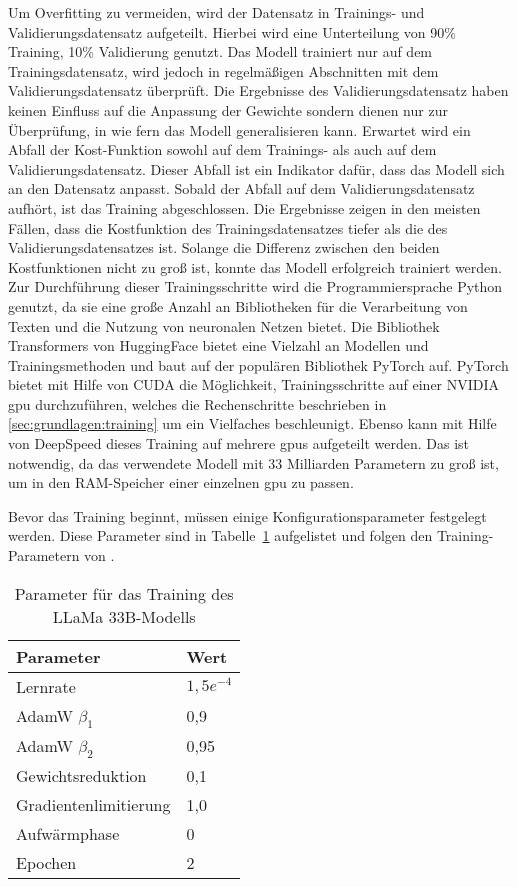 Um Overfitting zu vermeiden, wird der Datensatz in Trainings- und Validierungsdatensatz aufgeteilt.
Hierbei wird eine Unterteilung von 90\% Training, 10\% Validierung genutzt.
Das Modell trainiert nur auf dem Trainingsdatensatz, wird jedoch in regelmäßigen Abschnitten mit dem Validierungsdatensatz überprüft.
Die Ergebnisse des Validierungsdatensatz haben keinen Einfluss auf die Anpassung der Gewichte sondern dienen nur zur Überprüfung, in wie fern das Modell generalisieren kann.
Erwartet wird ein Abfall der Kost-Funktion sowohl auf dem Trainings- als auch auf dem Validierungsdatensatz.
Dieser Abfall ist ein Indikator dafür, dass das Modell sich an den Datensatz anpasst.
Sobald der Abfall auf dem Validierungsdatensatz aufhört, ist das Training abgeschlossen.
Die Ergebnisse zeigen in den meisten Fällen, dass die Kostfunktion des Trainingsdatensatzes tiefer als die des Validierungsdatensatzes ist.
Solange die Differenz zwischen den beiden Kostfunktionen nicht zu groß ist, konnte das Modell erfolgreich trainiert werden.\\

Zur Durchführung dieser Trainingsschritte wird die Programmiersprache Python genutzt, da sie eine große Anzahl an Bibliotheken für die Verarbeitung von Texten und die Nutzung von neuronalen Netzen bietet.
Die Bibliothek Transformers von HuggingFace bietet eine Vielzahl an Modellen und Trainingsmethoden und baut auf der populären Bibliothek PyTorch auf.
PyTorch bietet mit Hilfe von CUDA die Möglichkeit, Trainingsschritte auf einer NVIDIA \ac{gpu} durchzuführen, welches die Rechenschritte beschrieben in \ref{sec:grundlagen:training} um ein Vielfaches beschleunigt. %
Ebenso kann mit Hilfe von DeepSpeed dieses Training auf mehrere \ac{gpu}s aufgeteilt werden.
Das ist notwendig, da das verwendete Modell mit 33 Milliarden Parametern zu groß ist, um in den RAM-Speicher einer einzelnen \ac{gpu} zu passen.

Bevor das Training beginnt, müssen einige Konfigurationsparameter festgelegt werden.
Diese Parameter sind in Tabelle~\ref{tab:training:parameter} aufgelistet und folgen den Training-Parametern von \citet{llama}.\\

\begin{table}
    \centering
    \begin{tabular}{ll}
        \hline
        \textbf{Parameter} & \textbf{Wert} \\
        \hline
        Lernrate & $1,5e^{-4}$\\
        AdamW $\beta_1$ & 0,9\\
        AdamW $\beta_2$ & 0,95\\
        Gewichtsreduktion & 0,1\\
        Gradientenlimitierung & 1,0\\
        Aufwärmphase & 0\\
        Epochen & 2\\
        \hline
    \end{tabular}
    \caption{Parameter für das Training des LLaMa 33B-Modells}
    \label{tab:training:parameter}
\end{table}


